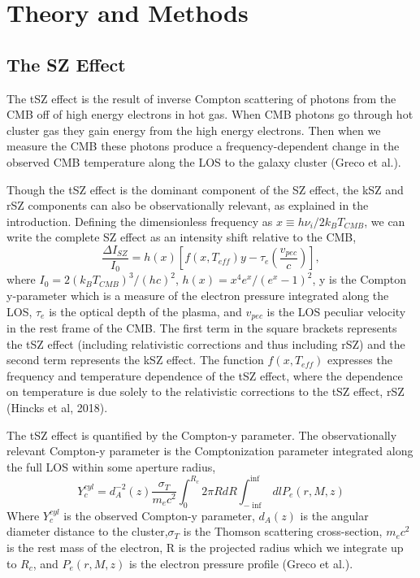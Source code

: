 \documentclass{princeton_astro_thesis}
\begin{document}
 \chapter{Theory and Methods}
\section{The SZ Effect}
The tSZ effect is the result of inverse Compton scattering of photons from the CMB off of high energy electrons in hot gas. When CMB photons go through hot cluster gas they gain energy from the high energy electrons. Then when we measure the CMB these photons produce a frequency-dependent change in the observed CMB temperature along the LOS to the galaxy cluster (Greco et al.). 
\par Though the tSZ effect is the dominant component of the SZ effect, the kSZ and rSZ components can also be observationally relevant, as explained in the introduction. Defining the dimensionless frequency as $x\equiv h\nu_i/2k_B T_{CMB}$, we can write the complete SZ effect as an intensity shift relative to the CMB,
\begin{equation}
\frac{\Delta I_{SZ}}{I_0}=h(x)\left[f(x,T_{eff})y-\tau_{e}\left(\frac{v_{pec}}{c}\right)\right],
\end{equation}
where $I_0=2(k_B T_{CMB})^3/(hc)^2$, $h(x)=x^4 e^x/(e^x-1)^2$, y is the Compton y-parameter which is a measure of the electron pressure integrated along the LOS, $\tau_e$ is the optical depth of the plasma, and $v_{pec}$ is the LOS peculiar velocity in the rest frame of the CMB. The first term in the square brackets represents the tSZ effect (including relativistic corrections and thus including rSZ) and the second term represents the kSZ effect. The function $f(x,T_{eff})$ expresses the frequency and temperature dependence of the tSZ effect, where the dependence on temperature is due solely to the relativistic corrections to the tSZ effect, rSZ (Hincks et al, 2018).
\par The tSZ effect is quantified by the Compton-y parameter. The observationally relevant Compton-y parameter is the Comptonization parameter integrated along the full LOS within some aperture radius,
\begin{equation}
Y^{cyl}_{c}=d^{-2}_A(z) \frac{\sigma_T}{m_e c^2}\int_0^{R_c} 2 \pi R dR \int_{-\inf}^{\inf} dl P_e(r,M,z)
\end{equation}
Where $Y^{cyl}_{c}$ is the observed Compton-y parameter, $d_A(z)$ is the angular diameter distance to the cluster,$\sigma_T$ is the Thomson scattering cross-section, $m_e c^2$ is the rest mass of the electron, R is the  projected radius which we integrate up to $R_c$,  and $P_e(r,M,z)$ is the electron pressure profile (Greco et al.).
\end{document}
